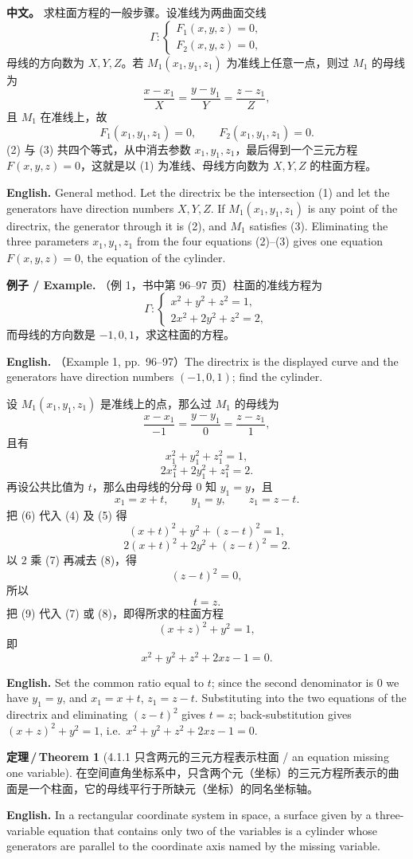 \documentclass[UTF8,11pt,a4paper]{ctexart}
\newcommand{\APS}[2]{\par\noindent\textbf{中文。} #1\par\noindent\textbf{English.} #2\par\smallskip}
\newcommand{\EN}[1]{\par\noindent \textbf{English.} #1\par}
\newcommand{\EX}[2]{\par\noindent \textbf{例子 / Example.} #1\par\EN{#2}}
\theoremstyle{definition}
\newtheorem*{theorem}{定理\,/\,Theorem}
\begin{document}
\APS{求柱面方程的一般步骤。设准线为两曲面交线
\[
\Gamma:\begin{cases}F_1(x,y,z)=0,\\ F_2(x,y,z)=0,\end{cases}\tag{1}
\]
母线的方向数为 $X,Y,Z$。若 $M_1(x_1,y_1,z_1)$ 为准线上任意一点，则过 $M_1$ 的母线为
\[
\frac{x-x_1}{X}=\frac{y-y_1}{Y}=\frac{z-z_1}{Z},\tag{2}
\]
且 $M_1$ 在准线上，故
\[
F_1(x_1,y_1,z_1)=0,\qquad F_2(x_1,y_1,z_1)=0.\tag{3}
\]
(2) 与 (3) 共四个等式，从中消去参数 $x_1,y_1,z_1$，最后得到一个三元方程 $F(x,y,z)=0$，这就是以 (1) 为准线、母线方向数为 $X,Y,Z$ 的柱面方程。}{General method. Let the directrix be the intersection (1) and let the generators have direction numbers $X,Y,Z$. If $M_1(x_1,y_1,z_1)$ is any point of the directrix, the generator through it is (2), and $M_1$ satisfies (3). Eliminating the three parameters $x_1,y_1,z_1$ from the four equations (2)--(3) gives one equation $F(x,y,z)=0$, the equation of the cylinder.}

\EX{（例 1，书中第 96--97 页）柱面的准线方程为
\[
\Gamma:\begin{cases}x^2+y^2+z^2=1,\\ 2x^2+2y^2+z^2=2,\end{cases}
\]
而母线的方向数是 $-1,0,1$，求这柱面的方程。}{（Example 1, pp.~96--97）The directrix is the displayed curve and the generators have direction numbers $(-1,0,1)$; find the cylinder.}
设 $M_1(x_1,y_1,z_1)$ 是准线上的点，那么过 $M_1$ 的母线为
\[
\frac{x-x_1}{-1}=\frac{y-y_1}{0}=\frac{z-z_1}{1},
\]
且有
\[
x_1^2+y_1^2+z_1^2=1,\tag{4}
\]
\[
2x_1^2+2y_1^2+z_1^2=2.\tag{5}
\]
再设公共比值为 $t$，那么由母线的分母 $0$ 知 $y_1=y$，且
\[
x_1=x+t,\qquad y_1=y,\qquad z_1=z-t.\tag{6}
\]
把 (6) 代入 (4) 及 (5) 得
\[
(x+t)^2+y^2+(z-t)^2=1,\tag{7}
\]
\[
2(x+t)^2+2y^2+(z-t)^2=2.\tag{8}
\]
以 $2$ 乘 (7) 再减去 (8)，得
\[
(z-t)^2=0,
\]
所以
\[
t=z.\tag{9}
\]
把 (9) 代入 (7) 或 (8)，即得所求的柱面方程
\[
(x+z)^2+y^2=1,
\]
即
\[
x^2+y^2+z^2+2xz-1=0.
\]
\EN{Set the common ratio equal to $t$; since the second denominator is $0$ we have $y_1=y$, and $x_1=x+t$, $z_1=z-t$. Substituting into the two equations of the directrix and eliminating $(z-t)^2$ gives $t=z$; back-substitution gives $(x+z)^2+y^2=1$, i.e.\ $x^2+y^2+z^2+2xz-1=0$.}

\begin{theorem}[4.1.1 只含两元的三元方程表示柱面 / an equation missing one variable]\label{thm:cylinder}
在空间直角坐标系中，只含两个元（坐标）的三元方程所表示的曲面是一个柱面，它的母线平行于所缺元（坐标）的同名坐标轴。
\EN{In a rectangular coordinate system in space, a surface given by a three-variable equation that contains only two of the variables is a cylinder whose generators are parallel to the coordinate axis named by the missing variable.}
\end{theorem}
\end{document}
